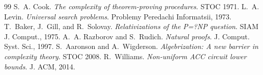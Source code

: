 \documentclass[11pt,a4paper]{article}
\begin{document}
\begin{thebibliography}{99}
 S.~A. Cook. \emph{The complexity of theorem-proving procedures}. STOC 1971.
 L.~A. Levin. \emph{Universal search problems}. Problemy Peredachi Informatsii, 1973.
 T.~Baker, J.~Gill, and R.~Solovay. \emph{Relativizations of the P=?NP question}. SIAM J. Comput., 1975.
 A.~A. Razborov and S.~Rudich. \emph{Natural proofs}. J. Comput. Syst. Sci., 1997.
 S.~Aaronson and A.~Wigderson. \emph{Algebrization: A new barrier in complexity theory}. STOC 2008.
 R.~Williams. \emph{Non-uniform ACC circuit lower bounds}. J. ACM, 2014.
\end{thebibliography}
\end{document}
